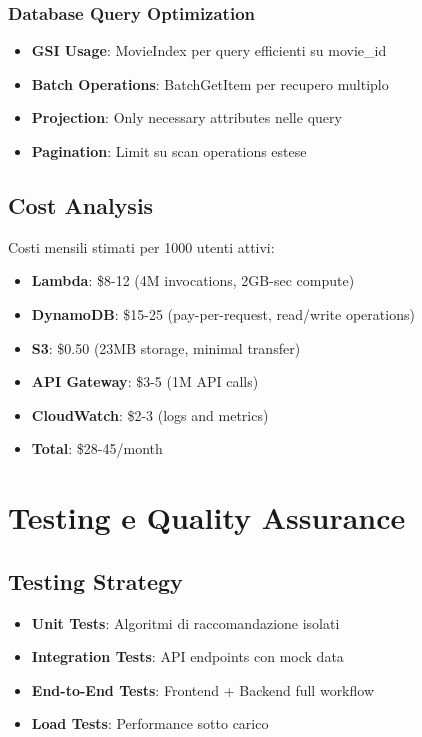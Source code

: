 \documentclass[11pt,a4paper]{article}
\begin{document}
\subsubsection{Database Query Optimization}
\begin{itemize}
  \item \textbf{GSI Usage}: MovieIndex per query efficienti su movie\_id
  \item \textbf{Batch Operations}: BatchGetItem per recupero multiplo
  \item \textbf{Projection}: Only necessary attributes nelle query
  \item \textbf{Pagination}: Limit su scan operations estese
\end{itemize}

\subsection{Cost Analysis}
Costi mensili stimati per 1000 utenti attivi:

\begin{itemize}
  \item \textbf{Lambda}: \$8-12 (4M invocations, 2GB-sec compute)
  \item \textbf{DynamoDB}: \$15-25 (pay-per-request, read/write operations)
  \item \textbf{S3}: \$0.50 (23MB storage, minimal transfer)
  \item \textbf{API Gateway}: \$3-5 (1M API calls)
  \item \textbf{CloudWatch}: \$2-3 (logs and metrics)
  \item \textbf{Total}: \$28-45/month
\end{itemize}

\section{Testing e Quality Assurance}

\subsection{Testing Strategy}
\begin{itemize}
  \item \textbf{Unit Tests}: Algoritmi di raccomandazione isolati
  \item \textbf{Integration Tests}: API endpoints con mock data
  \item \textbf{End-to-End Tests}: Frontend + Backend full workflow
  \item \textbf{Load Tests}: Performance sotto carico
\end{itemize}
\end{document}
